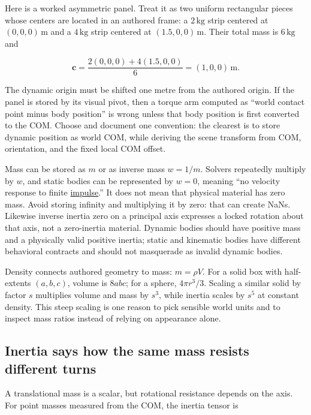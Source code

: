 Here is a worked asymmetric panel. Treat it as two uniform rectangular pieces whose centers are located in an authored frame: a \(2\,\mathrm{kg}\) strip centered at \((0,0,0)\,\mathrm m\) and a \(4\,\mathrm{kg}\) strip centered at \((1.5,0,0)\,\mathrm m\). Their total mass is \(6\,\mathrm{kg}\) and

\[
\mathbf c=\frac{2(0,0,0)+4(1.5,0,0)}{6}=(1,0,0)\,\mathrm m.
\]

The dynamic origin must be shifted one metre from the authored origin. If the panel is stored by its visual pivot, then a torque arm computed as ``world contact point minus body position'' is wrong unless that body position is first converted to the COM. Choose and document one convention: the clearest is to store dynamic position as world COM, while deriving the scene transform from COM, orientation, and the fixed local COM offset.

Mass can be stored as \(m\) or as inverse mass \(w=1/m\). Solvers repeatedly multiply by \(w\), and static bodies can be represented by \(w=0\), meaning ``no velocity response to finite \hyperref[appendix-c39931e6e4c2]{impulse}.'' It does not mean that physical material has zero mass. Avoid storing infinity and multiplying it by zero: that can create NaNs. Likewise inverse inertia zero on a principal axis expresses a locked rotation about that axis, not a zero-inertia material. Dynamic bodies should have positive mass and a physically valid positive inertia; static and kinematic bodies have different behavioral contracts and should not masquerade as invalid dynamic bodies.

Density connects authored geometry to mass: \(m=\rho V\). For a solid box with half-extents \((a,b,c)\), volume is \(8abc\); for a sphere, \(4\pi r^3/3\). Scaling a similar solid by factor \(s\) multiplies volume and mass by \(s^3\), while inertia scales by \(s^5\) at constant density. This steep scaling is one reason to pick sensible world units and to inspect mass ratios instead of relying on appearance alone.

\subsection{Inertia says how the same mass resists different turns}\label{06-engine-ii-ch034-inertia-says-how-the-same-mass-resists-different-turns}

\hypertarget{06-engine-ii-ch034-inertia-says-how-the-same-mass-resists-different-turns}{}

A translational mass is a scalar, but rotational resistance depends on the axis. For point masses measured from the COM, the inertia tensor is

